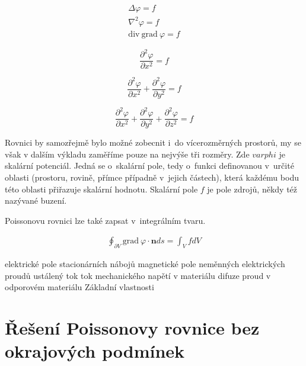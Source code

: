\documentclass{book}
\newcommand{\vect}[1]{\boldsymbol{#1}}
\newcommand{\grad}{\mathrm{grad}}
\newcommand{\diverg}{\mathrm{div}}
\begin{document}
\begin{equation}
\label{eq:poissonova_rovnice_definice}
\begin{split}
\Delta \varphi = f \\
\nabla^2 \varphi = f \\
\diverg \ \grad \ \varphi = f
\end{split}
\end{equation}

\begin{equation}
\label{eq:poissonova_rovnice_primka}
\frac{\partial^2 \varphi}{\partial x^2} = f
\end{equation}

\begin{equation}
\label{eq:poissonova_rovnice_rovina}
\frac{\partial^2 \varphi}{\partial x^2} + \frac{\partial^2 \varphi}{\partial y^2} = f
\end{equation}

\begin{equation}
\label{eq:poissonova_rovnice_prostor}
\frac{\partial^2 \varphi}{\partial x^2} + \frac{\partial^2 \varphi}{\partial y^2} + \frac{\partial^2 \varphi}{\partial z^2} = f
\end{equation}

Rovnici by samozřejmě bylo možné zobecnit i~do vícerozměrných prostorů, my se však v dalším výkladu zaměříme pouze na nejvýše tři rozměry.
Zde \(varphi\) je skalární potenciál. Jedná se o~skalární pole, tedy o~funkci definovanou v~určité oblasti (prostoru, rovině, přímce případně v~jejich částech), která každému bodu této oblasti přiřazuje skalární
hodnotu. Skalární pole \(f\) je pole zdrojů, někdy též nazývané buzení.

Poissonovu rovnici lze také zapsat v~integrálním tvaru.

\begin{equation}
\label{eq:poissonova_rovnice_integralni_tvar}
\begin{split}
\oint_{\partial V} \grad \ \varphi \cdot \vect{n} ds = \int_V f dV
\end{split}
\end{equation}


elektrické pole stacionárních nábojů
magnetické pole neměnných elektrických proudů
ustálený tok
tok mechanického napětí v materiálu
difuze
proud v odporovém materiálu
Základní vlastnosti


\section{Řešení Poissonovy rovnice bez okrajových podmínek}
\end{document}
